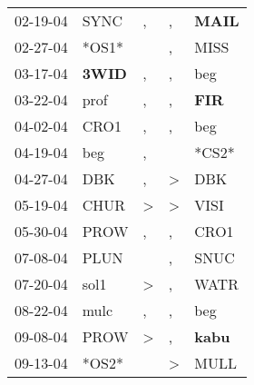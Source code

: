 \begin{supertabular}{p{0.07\textwidth}p{0.06\textwidth}p{0.02\textwidth}p{0.02\textwidth}p{0.06\textwidth}}
          02-19-04\textsuperscript{} &           SYNC\textsuperscript{} &                , &                , &  \textbf{MAIL\textsuperscript{}} \\
          02-27-04\textsuperscript{} &                            *OS1* &                  &                , &           MISS\textsuperscript{} \\
          03-17-04\textsuperscript{} &  \textbf{3WID\textsuperscript{}} &                , &                , &            beg\textsuperscript{} \\
          03-22-04\textsuperscript{} &           prof\textsuperscript{} &                , &                , &   \textbf{FIR\textsuperscript{}} \\
          04-02-04\textsuperscript{} &           CRO1\textsuperscript{} &                , &                , &            beg\textsuperscript{} \\
          04-19-04\textsuperscript{} &            beg\textsuperscript{} &                , &                  &                            *CS2* \\
          04-27-04\textsuperscript{} &            DBK\textsuperscript{} &                , &     \textgreater &            DBK\textsuperscript{} \\
          05-19-04\textsuperscript{} &           CHUR\textsuperscript{} &     \textgreater &     \textgreater &           VISI\textsuperscript{} \\
          05-30-04\textsuperscript{} &           PROW\textsuperscript{} &                , &                , &           CRO1\textsuperscript{} \\
          07-08-04\textsuperscript{} &           PLUN\textsuperscript{} &                  &                , &           SNUC\textsuperscript{} \\
          07-20-04\textsuperscript{} &           sol1\textsuperscript{} &     \textgreater &                , &           WATR\textsuperscript{} \\
          08-22-04\textsuperscript{} &           mulc\textsuperscript{} &                , &                , &            beg\textsuperscript{} \\
          09-08-04\textsuperscript{} &           PROW\textsuperscript{} &     \textgreater &                , &  \textbf{kabu\textsuperscript{}} \\
          09-13-04\textsuperscript{} &                            *OS2* &                  &     \textgreater &           MULL\textsuperscript{} \\

\end{supertabular}
